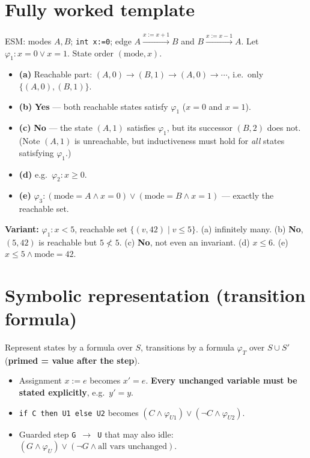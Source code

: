 \section{Fully worked template}
ESM: modes $A,B$; \texttt{int x:=0}; edge $A \xrightarrow{x:=x+1} B$ and $B \xrightarrow{x:=x-1} A$. Let $\varphi_1: x=0 \vee x=1$. State order $(\text{mode},x)$.
\begin{itemize}
  \item \textbf{(a)} Reachable part: $(A,0)\to(B,1)\to(A,0)\to\cdots$, i.e.\ only $\{(A,0),(B,1)\}$.
  \item \textbf{(b)} \textbf{Yes} --- both reachable states satisfy $\varphi_1$ ($x=0$ and $x=1$).
  \item \textbf{(c)} \textbf{No} --- the state $(A,1)$ satisfies $\varphi_1$, but its successor $(B,2)$ does not. (Note $(A,1)$ is unreachable, but inductiveness must hold for \emph{all} states satisfying $\varphi_1$.)
  \item \textbf{(d)} e.g.\ $\varphi_2: x\ge 0$.
  \item \textbf{(e)} $\varphi_3: (\text{mode}=A \wedge x=0) \vee (\text{mode}=B \wedge x=1)$ --- exactly the reachable set.
\end{itemize}
\textbf{Variant:} $\varphi_1: x<5$, reachable set $\{(v,42)\mid v\le 5\}$. (a) infinitely many. (b) \textbf{No}, $(5,42)$ is reachable but $5\not<5$. (c) \textbf{No}, not even an invariant. (d) $x\le 6$. (e) $x\le 5 \wedge \text{mode}=42$.

\section{Symbolic representation (transition formula)}
Represent states by a formula over $S$, transitions by a formula $\varphi_T$ over $S\cup S'$ (\textbf{primed = value after the step}).
\begin{itemize}
  \item Assignment $x:=e$ becomes $x'=e$. \textbf{Every unchanged variable must be stated explicitly}, e.g.\ $y'=y$.
  \item \texttt{if C then U1 else U2} becomes $(C \wedge \varphi_{U1}) \vee (\neg C \wedge \varphi_{U2})$.
  \item Guarded step \texttt{G $\rightarrow$ U} that may also idle: $(G \wedge \varphi_U) \vee (\neg G \wedge \text{all vars unchanged})$.
\end{itemize}

